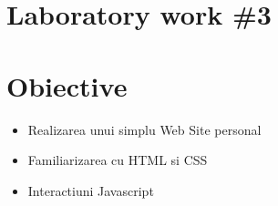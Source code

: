 \section*{Laboratory work \#3}

\section{Obiective}

\begin{itemize}
\item Realizarea unui simplu Web Site personal
\item Familiarizarea cu HTML si CSS
\item Interactiuni Javascript
\end{itemize}

\clearpage